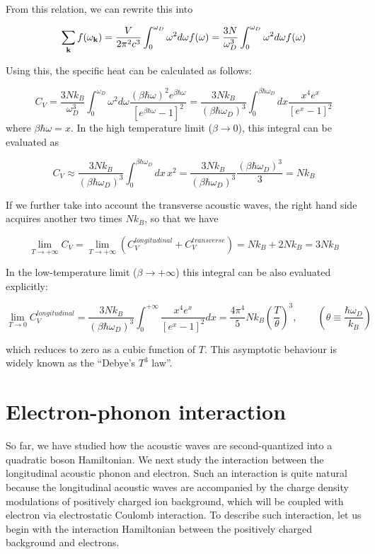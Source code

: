 From this relation, we can rewrite this into

\[\sum_{\bf k}f(\omega_{\bf k}) = \frac{V}{2\pi^2c^3}\int_0^{\omega_D} \omega^2d\omega f(\omega) = \frac{3N}{\omega_D^3}\int_0^{\omega_D} \omega^2d\omega f(\omega) \]

Using this, the specific heat can be calculated as follows:

\[C_V = \frac{3Nk_B}{\omega_D^3}\int_0^{\omega_D} \omega^2d\omega \frac{({\beta\hbar\omega})^2e^{\beta\hbar\omega}}{[e^{\beta\hbar\omega} - 1]^2} = \frac{3Nk_B}{(\beta\hbar\omega_D)^3}\int_0^{\beta\hbar\omega_D} dx \frac{x^4e^x}{[e^x - 1]^2} \]
where $\beta\hbar\omega = x$. In the high temperature limit ($\beta\to0$), this integral can be evaluated as

\[C_V \approx\frac{3Nk_B}{(\beta\hbar\omega_D)^3}\int_0^{\beta\hbar\omega_D} dx\, x^2 = \frac{3Nk_B}{(\beta\hbar\omega_D)^3}\frac{(\beta\hbar\omega_D)^3}{3} = Nk_B \]

If we further take into account the transverse acoustic waves, the right hand side acquires another two times $Nk_B$, so that we have

\[\lim_{T\to+\infty}C_V = \lim_{T\to+\infty}\left(C_V^{longitudinal}+C_V^{transverse}\right) = Nk_B+2Nk_B = 3Nk_B \]

In the low-temperature limit ($\beta\to+\infty$) this integral can be also evaluated explicitly:

\[\lim_{T\to0}C_V^{longitudinal} = \frac{3Nk_B}{(\beta\hbar\omega_D)^3}\int_0^{+\infty}\frac{x^4e^x}{[e^x-1]^2}dx = \frac{4\pi^4}{5}Nk_B\left(\frac{T}{\theta}\right)^3,\quad\quad\left(\theta \equiv \frac{\hbar\omega_D}{k_B}\right) \]

which reduces to zero as a cubic function of $T$. This asymptotic behaviour is widely known as the ``Debye's $T^3$ law''.


\section{Electron-phonon interaction} \label{se5-2}%

So far, we have studied how the acoustic waves are second-quantized into a quadratic boson Hamiltonian. We next study the interaction between the longitudinal acoustic phonon and electron. Such an interaction is quite natural because the longitudinal acoustic waves are accompanied by the charge density modulations of positively charged ion background, which will be coupled with electron via electrostatic Coulomb interaction. To describe such interaction, let us begin with the interaction Hamiltonian between the positively charged background and electrons.


